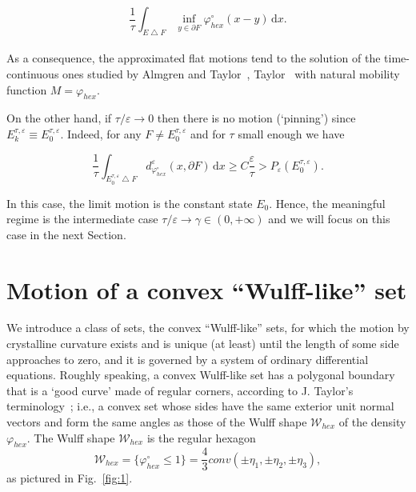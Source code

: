 \documentclass{interact}
\numberwithin{equation}{section}
\theoremstyle{definition}
\renewcommand{\epsilon}{\varepsilon}
\def\e{\epsilon}
\begin{document}
\begin{equation}
\frac{1}{\tau}\displaystyle\int_{E\bigtriangleup F}\inf_{y\in\partial F}\varphi^\circ_{hex}(x-y)\,\mathrm{d}x.
\end{equation}
\\
As a consequence, the approximated flat motions tend to the solution of the time-continuous ones studied by {Almgren} and {Taylor}~\cite{AT95}, Taylor~\cite{Ta} with natural mobility function $M=\varphi_{hex}$.

On the other hand, if $\tau/\epsilon\to0$ then there is no motion (`pinning') since $E^{\tau,\epsilon}_k\equiv E_0^{\tau,\e}$. Indeed, for any $F\neq E_0^{\tau,\e}$ and for $\tau$ small enough we have

\begin{equation*}
\frac{1}{\tau}\int_{E_0^{\tau,\e}\bigtriangleup F}d_{\varphi^\circ_{hex}}^\epsilon(x,\partial F)\,\mathrm{d}x\geq C\frac{\epsilon}{\tau}>P_\epsilon(E_0^{\tau,\e}).
\end{equation*}

In this case, the limit motion is the constant state $E_0$. Hence, the meaningful regime is the intermediate case $\tau/\epsilon\to\gamma\in(0,+\infty)$ and we will focus on this case in the next Section.

\bigskip


\section{Motion of a convex ``Wulff-like'' set}\label{hexagonal}

We introduce a class of sets, the convex ``Wulff-like'' sets, for which the motion by crystalline curvature {exists and is unique (at least) until the length of some side approaches to zero, and it is governed by a system of ordinary differential equations.} 
Roughly speaking, a convex {Wulff-like} set has a polygonal boundary that is a `good curve' made of regular corners, according to J. Taylor's terminology~\cite{Ta, AT95}; i.e., a convex set whose sides have the same exterior unit normal vectors and form the same angles as those of the Wulff shape $\mathcal{W}_{{hex}}$ of the density $\varphi_{hex}$. The Wulff shape $\mathcal{W}_{hex}$ is the regular hexagon 
\begin{equation}
\mathcal{W}_{hex}=\{\varphi_{hex}^\circ\leq1\}=\frac{4}{{3}}conv(\pm \eta_1,\pm \eta_2, \pm \eta_3),
\label{wulff}
\end{equation}
as pictured in Fig.~\ref{fig:1}.
\end{document}
